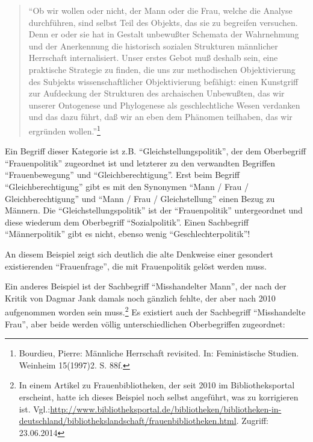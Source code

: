 \documentclass[a4paper,
fontsize=11pt,
oneside,
numbers=noperiodatend,
parskip=half-,
bibliography=totoc,
final
]{scrartcl}
\begin{document}
\begin{quote}
\enquote{Ob wir wollen oder nicht, der Mann oder die Frau, welche die
Analyse durchführen, sind selbst Teil des Objekts, das sie zu begreifen
versuchen. Denn er oder sie hat in Gestalt unbewußter Schemata der
Wahrnehmung und der Anerkennung die historisch sozialen Strukturen
männlicher Herrschaft internalisiert. Unser erstes Gebot muß deshalb
sein, eine praktische Strategie zu finden, die uns zur methodischen
Objektivierung des Subjekts wissenschaftlicher Objektivierung befähigt:
einen Kunstgriff zur Aufdeckung der Strukturen des archaischen
Unbewußten, das wir unserer Ontogenese und Phylogenese als
geschlechtliche Wesen verdanken und das dazu führt, daß wir an eben dem
Phänomen teilhaben, das wir ergründen wollen.}\footnote{Bourdieu,
  Pierre: Männliche Herrschaft revisited. In: Feministische Studien.
  Weinheim 15(1997)2. S. 88f.}
\end{quote}

Ein Begriff dieser Kategorie ist z.B. \enquote{Gleichstellungspolitik},
der dem Oberbegriff \enquote{Frauenpolitik} zugeordnet ist und letzterer
zu den verwandten Begriffen \enquote{Frauenbewegung} und
\enquote{Gleichberechtigung}. Erst beim Begriff
\enquote{Gleichberechtigung} gibt es mit den Synonymen \enquote{Mann /
Frau / Gleichberechtigung} und \enquote{Mann / Frau / Gleichstellung}
einen Bezug zu Männern. Die \enquote{Gleichstellungspolitik} ist der
\enquote{Frauenpolitik} untergeordnet und diese wiederum dem Oberbegriff
\enquote{Sozialpolitik}. Einen Sachbegriff \enquote{Männerpolitik} gibt
es nicht, ebenso wenig \enquote{Geschlechterpolitik}!

An diesem Beispiel zeigt sich deutlich die alte Denkweise einer
gesondert existierenden \enquote{Frauenfrage}, die mit Frauenpolitik
gelöst werden muss.

Ein anderes Beispiel ist der Sachbegriff \enquote{Misshandelter Mann},
der nach der Kritik von Dagmar Jank damals noch gänzlich fehlte, der
aber nach 2010 aufgenommen worden sein muss.\footnote{In einem Artikel
  zu Frauenbibliotheken, der seit 2010 im Bibliotheksportal erscheint,
  hatte ich dieses Beispiel noch selbst angeführt, was zu korrigieren
  ist.
  Vgl.:\url{http://www.bibliotheksportal.de/bibliotheken/bibliotheken-in-deutschland/bibliothekslandschaft/frauenbibliotheken.html}.
  Zugriff: 23.06.2014} Es existiert auch der Sachbegriff
\enquote{Misshandelte Frau}, aber beide werden völlig unterschiedlichen
Oberbegriffen zugeordnet:
\end{document}
